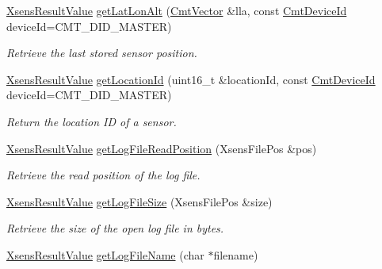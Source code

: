 \begin{DoxyCompactItemize}
\item 
\hyperlink{group__enums_ga822a2260a20af524029eef9e9a51ff6f}{\-Xsens\-Result\-Value} \hyperlink{classxsens_1_1Cmt3_a242e67624c28660f80e386633020f6c3}{get\-Lat\-Lon\-Alt} (\hyperlink{structCmtVector}{\-Cmt\-Vector} \&lla, const \hyperlink{cmtdef_8h_a2e3b6a17360828d440ee848959918af2}{\-Cmt\-Device\-Id} device\-Id=\-C\-M\-T\-\_\-\-D\-I\-D\-\_\-\-M\-A\-S\-T\-E\-R)
\begin{DoxyCompactList}\small\item\em \-Retrieve the last stored sensor position. \end{DoxyCompactList}\item 
\hyperlink{group__enums_ga822a2260a20af524029eef9e9a51ff6f}{\-Xsens\-Result\-Value} \hyperlink{classxsens_1_1Cmt3_afeac6344bde509cc83b4c33cfe65303a}{get\-Location\-Id} (uint16\-\_\-t \&location\-Id, const \hyperlink{cmtdef_8h_a2e3b6a17360828d440ee848959918af2}{\-Cmt\-Device\-Id} device\-Id=\-C\-M\-T\-\_\-\-D\-I\-D\-\_\-\-M\-A\-S\-T\-E\-R)
\begin{DoxyCompactList}\small\item\em \-Return the location \-I\-D of a sensor. \end{DoxyCompactList}\item 
\hyperlink{group__enums_ga822a2260a20af524029eef9e9a51ff6f}{\-Xsens\-Result\-Value} \hyperlink{classxsens_1_1Cmt3_a8926b9f31ba378331cf83fee568bd032}{get\-Log\-File\-Read\-Position} (\-Xsens\-File\-Pos \&pos)
\begin{DoxyCompactList}\small\item\em \-Retrieve the read position of the log file. \end{DoxyCompactList}\item 
\hypertarget{classxsens_1_1Cmt3_a8db47b02b0fcfe12eb5df8489daaf13d}{\hyperlink{group__enums_ga822a2260a20af524029eef9e9a51ff6f}{\-Xsens\-Result\-Value} \hyperlink{classxsens_1_1Cmt3_a8db47b02b0fcfe12eb5df8489daaf13d}{get\-Log\-File\-Size} (\-Xsens\-File\-Pos \&size)}\label{classxsens_1_1Cmt3_a8db47b02b0fcfe12eb5df8489daaf13d}

\begin{DoxyCompactList}\small\item\em \-Retrieve the size of the open log file in bytes. \end{DoxyCompactList}\item 
\hypertarget{classxsens_1_1Cmt3_a572b9ad1b780d3bde06f2e08c4002758}{\hyperlink{group__enums_ga822a2260a20af524029eef9e9a51ff6f}{\-Xsens\-Result\-Value} \hyperlink{classxsens_1_1Cmt3_a572b9ad1b780d3bde06f2e08c4002758}{get\-Log\-File\-Name} (char $\ast$filename)}\label{classxsens_1_1Cmt3_a572b9ad1b780d3bde06f2e08c4002758}


\end{DoxyCompactItemize}
